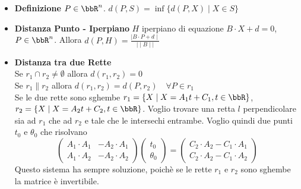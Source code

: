 \documentclass[a4paper,NoNotes]{stdmdoc}
\newcommand{\Norm}[1]{\mid\mid #1 \mid\mid}
\begin{document}
	\begin{itemize}
		\item {\bf Definizione} $P \in \bbR^n$. $d(P, S) = \inf \{d(P,X) \mid X \in S \}$
		\item {\bf Distanza Punto - Iperpiano} $H$ iperpiano di equazione $B \cdot X + d = 0$, $P \in \bbR^n$. Allora $d(P, H) = \frac{\mid B \cdot P + d \mid}{\Norm{B}}$
		\item {\bf Distanza tra due Rette} \\ Se $r_1 \cap r_2 \neq \emptyset$ allora $d(r_1, r_2) = 0$ \\ Se $r_1 \parallel r_2$ allora $d(r_1, r_2) = d(P, r_2) \quad \forall P \in r_1$ \\ Se le due rette sono sghembe $r_1 = \{X \mid X = A_1t+C_1, t \in \bbR\}$, $r_2 = \{X \mid X = A_2t+C_2, t \in \bbR\}$. Voglio trovare una retta $l$ perpendicolare sia ad $r_1$ che ad $r_2$ e tale che le intersechi entrambe. Voglio quindi due punti $t_0$ e $\theta_0$ che risolvano $$\left( \begin{array}{cc} A_1\cdot A_1 & -A_2\cdot A_1 \\ A_1\cdot A_2 & -A_2\cdot A_2 \end{array} \right)\left(\begin{array}{c} t_0 \\ \theta_0 \end{array}\right) = \left( \begin{array}{c} C_2\cdot A_2 -C_1\cdot A_1 \\ C_2 \cdot A_2 - C_1 \cdot A_2 \end{array}\right)$$ Questo sistema ha sempre soluzione, poichè se le rette $r_1$ e $r_2$ sono sghembe la matrice è invertibile.
	\end{itemize}

\end{document}
